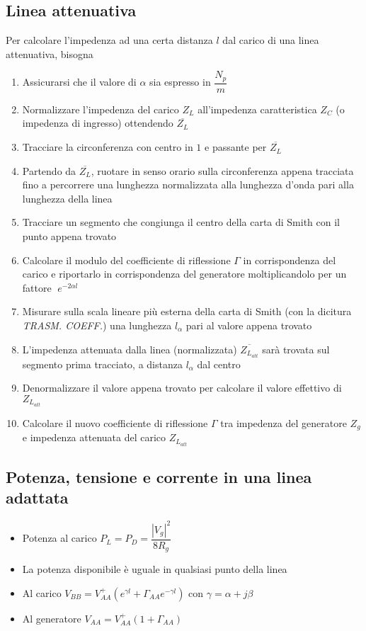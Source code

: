 \documentclass{article}
\begin{document}
\subsection{Linea attenuativa}
Per calcolare l'impedenza ad una certa distanza \(l\) dal carico di una linea attenuativa, bisogna
\begin{enumerate}
	\item Assicurarsi che il valore di \(\alpha\) sia espresso in \(\dfrac{N_p}{m}\)
	\item Normalizzare l'impedenza del carico \(Z_L\) all'impedenza caratteristica \(Z_C\) (o impedenza di ingresso) ottendendo \(\overline{Z_L}\)
	\item Tracciare la circonferenza con centro in \(1\) e passante per \( \overline{Z_L} \)
	\item Partendo da \(\overline{Z_L}\), ruotare in senso orario sulla circonferenza appena tracciata fino a percorrere una lunghezza normalizzata alla lunghezza d'onda pari alla lunghezza della linea
	\item Tracciare un segmento che congiunga il centro della carta di Smith con il punto appena trovato
	\item Calcolare il modulo del coefficiente di riflessione \(\Gamma\) in corrispondenza del carico e riportarlo in corrispondenza del generatore moltiplicandolo per un fattore \(\;e^{-2 \alpha l}\)
	\item Misurare sulla scala lineare più esterna della carta di Smith (con la dicitura \textit{TRASM. COEFF.}) una lunghezza \(l_\alpha\) pari al valore appena trovato
	\item L'impedenza attenuata dalla linea (normalizzata) \(\overline{Z_{L_{att}}}\) sarà trovata sul segmento prima tracciato, a distanza \( l_\alpha\) dal centro
	\item Denormalizzare il valore appena trovato per calcolare il valore effettivo di \( Z_{L_{att}} \)
	\item Calcolare il nuovo coefficiente di riflessione \(\Gamma\) tra impedenza del generatore \(Z_g\) e impedenza attenuata del carico \(Z_{L_{att}}\)
		
\end{enumerate}

\subsection{Potenza, tensione e corrente in una linea adattata}
\begin{itemize}
	\item Potenza al carico \(P_L = P_D = \dfrac{|V_g|^2}{8 R_g} \)
	\item La potenza disponibile è uguale in qualsiasi punto della linea
	\item Al carico \(V_{BB} = V_{AA}^+ \left( e ^ {\gamma l} + \Gamma_{AA} e^{-\gamma l} \right) \) con \(\gamma = \alpha + j \beta \)
	\item Al generatore \( V_{AA} = V_{AA}^+ \left( 1 + \Gamma_{AA} \right) \)
\end{itemize}
\end{document}
